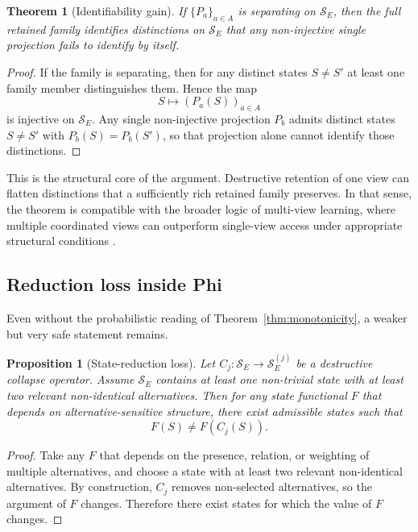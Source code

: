 \documentclass[11pt,a4paper]{article}
\newtheorem{theorem}{Theorem}
\newtheorem{proposition}{Proposition}
\begin{document}
\begin{theorem}[Identifiability gain]
\label{thm:ident}
If $\{P_a\}_{a \in A}$ is separating on $\mathcal{S}_E$, then the full retained family identifies distinctions on $\mathcal{S}_E$ that any non-injective single projection fails to identify by itself.
\end{theorem}

\begin{proof}
If the family is separating, then for any distinct states $S \neq S'$ at least one family member distinguishes them. Hence the map
\begin{equation}
S \mapsto (P_a(S))_{a \in A}
\end{equation}
is injective on $\mathcal{S}_E$. Any single non-injective projection $P_b$ admits distinct states $S \neq S'$ with $P_b(S)=P_b(S')$, so that projection alone cannot identify those distinctions.
\end{proof}

This is the structural core of the argument. Destructive retention of one view can flatten distinctions that a sufficiently rich retained family preserves. In that sense, the theorem is compatible with the broader logic of multi-view learning, where multiple coordinated views can outperform single-view access under appropriate structural conditions \cite{blum1998combining}.

\subsection{Reduction loss inside Phi}

Even without the probabilistic reading of Theorem~\ref{thm:monotonicity}, a weaker but very safe statement remains.

\begin{proposition}[State-reduction loss]
\label{prop:reduction}
Let $C_j : \mathcal{S}_E \to \mathcal{S}_E^{(j)}$ be a destructive collapse operator. Assume $\mathcal{S}_E$ contains at least one non-trivial state with at least two relevant non-identical alternatives. Then for any state functional $F$ that depends on alternative-sensitive structure, there exist admissible states such that
\begin{equation}
F(S) \neq F(C_j(S)).
\end{equation}
\end{proposition}

\begin{proof}
Take any $F$ that depends on the presence, relation, or weighting of multiple alternatives, and choose a state with at least two relevant non-identical alternatives. By construction, $C_j$ removes non-selected alternatives, so the argument of $F$ changes. Therefore there exist states for which the value of $F$ changes.
\end{proof}
\end{document}
